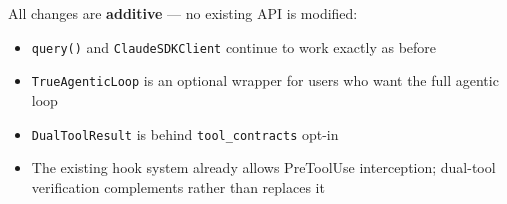 \documentclass[12pt,a4paper]{article}
\begin{document}
All changes are \textbf{additive} --- no existing API is modified:

\begin{itemize}
    \item \texttt{query()} and \texttt{ClaudeSDKClient} continue to work exactly as before
    \item \texttt{TrueAgenticLoop} is an optional wrapper for users who want the full agentic loop
    \item \texttt{DualToolResult} is behind \texttt{tool\_contracts} opt-in
    \item The existing hook system already allows PreToolUse interception; dual-tool verification complements rather than replaces it
\end{itemize}
\end{document}
